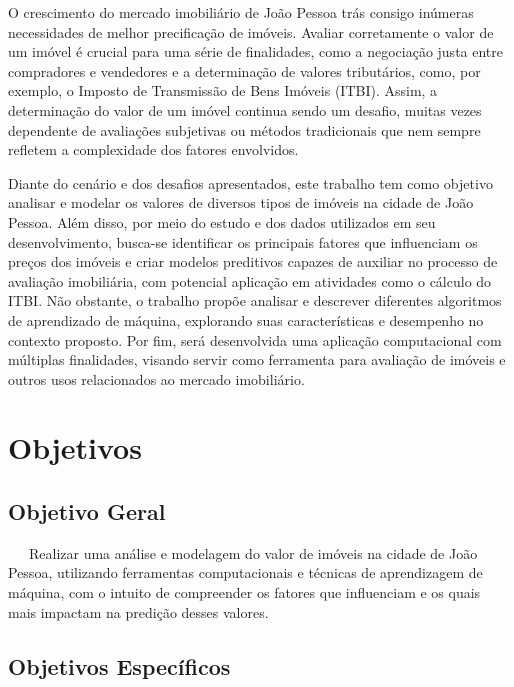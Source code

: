 \documentclass[
  12pt,
  a4paper,
]{scrreprt}
\begin{document}
\vspace{12pt}

O crescimento do mercado imobiliário de João Pessoa trás consigo
inúmeras necessidades de melhor precificação de imóveis. Avaliar
corretamente o valor de um imóvel é crucial para uma série de
finalidades, como a negociação justa entre compradores e vendedores e a
determinação de valores tributários, como, por exemplo, o Imposto de
Transmissão de Bens Imóveis (ITBI). Assim, a determinação do valor de um
imóvel continua sendo um desafio, muitas vezes dependente de avaliações
subjetivas ou métodos tradicionais que nem sempre refletem a
complexidade dos fatores envolvidos.

\vspace{12pt}

Diante do cenário e dos desafios apresentados, este trabalho tem como
objetivo analisar e modelar os valores de diversos tipos de imóveis na
cidade de João Pessoa. Além disso, por meio do estudo e dos dados
utilizados em seu desenvolvimento, busca-se identificar os principais
fatores que influenciam os preços dos imóveis e criar modelos preditivos
capazes de auxiliar no processo de avaliação imobiliária, com potencial
aplicação em atividades como o cálculo do ITBI. Não obstante, o trabalho
propõe analisar e descrever diferentes algoritmos de aprendizado de
máquina, explorando suas características e desempenho no contexto
proposto. Por fim, será desenvolvida uma aplicação computacional com
múltiplas finalidades, visando servir como ferramenta para avaliação de
imóveis e outros usos relacionados ao mercado imobiliário.

\section{Objetivos}\label{objetivos}

\subsection{Objetivo Geral}\label{objetivo-geral}

~~~Realizar uma análise e modelagem do valor de imóveis na cidade de
João Pessoa, utilizando ferramentas computacionais e técnicas de
aprendizagem de máquina, com o intuito de compreender os fatores que
influenciam e os quais mais impactam na predição desses valores.

\subsection{Objetivos Específicos}\label{objetivos-especuxedficos}
\end{document}
